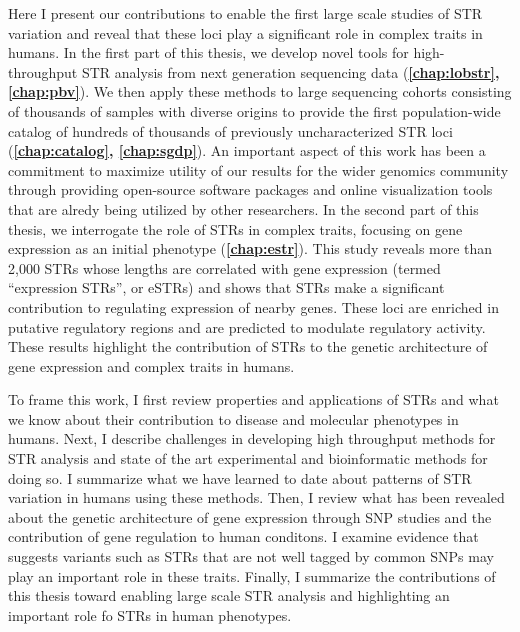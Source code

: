 Here I present our contributions to enable the first large scale studies of STR variation and reveal that these loci play a significant role in complex traits in humans. In the first part of this thesis, we develop novel tools for high-throughput STR analysis from next generation sequencing data (\textbf{\autoref{chap:lobstr}, \autoref{chap:pbv}}). We then apply these methods to large sequencing cohorts consisting of thousands of samples with diverse origins to provide the first population-wide catalog of hundreds of thousands of previously uncharacterized STR loci (\textbf{\autoref{chap:catalog}, \autoref{chap:sgdp}}). An important aspect of this work has been a commitment to maximize utility of our results for the wider genomics community through providing open-source software packages and online visualization tools that are alredy being utilized by other researchers. In the second part of this thesis, we interrogate the role of STRs in complex traits, focusing on gene expression as an initial phenotype (\textbf{\autoref{chap:estr}}). This study reveals more than 2,000 STRs whose lengths are correlated with gene expression (termed ``expression STRs'', or eSTRs) and shows that STRs make a significant contribution to regulating expression of nearby genes. These loci are enriched in putative regulatory regions and are predicted to modulate regulatory activity. These results highlight the contribution of STRs to the genetic architecture of gene expression and complex traits in humans.

To frame this work, I first review properties and applications of STRs and what we know about their contribution to disease and molecular phenotypes in humans. Next, I describe challenges in developing high throughput methods for STR analysis and state of the art experimental and bioinformatic methods for doing so. I summarize what we have learned to date about patterns of STR variation in humans using these methods. Then, I review what has been revealed about the genetic architecture of gene expression through SNP studies and the contribution of gene regulation to human conditons. I examine evidence that suggests variants such as STRs that are not well tagged by common SNPs may play an important role in these traits. Finally, I summarize the contributions of this thesis toward enabling large scale STR analysis and highlighting an important role fo STRs in human phenotypes.

